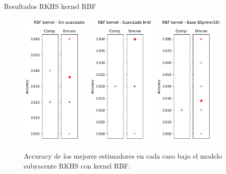 \documentclass[10pt, professionalfonts]{beamer}
\begin{document}
\begin{frame}{Resultados RKHS kernel RBF}
  \begin{figure}
    \includegraphics[width=0.3\textwidth]{img/results-new/clf_rkhs_rbf_none}\hfill
    \includegraphics[width=0.305\textwidth]{img/results-new/clf_rkhs_rbf_nw}\hfill
    \includegraphics[width=0.315\textwidth]{img/results-new/clf_rkhs_rbf_basis}
    \caption{Accuracy de los mejores estimadores en cada caso bajo el modelo subyacente RKHS con kernel RBF.}
  \end{figure}
\end{frame}
\end{document}
